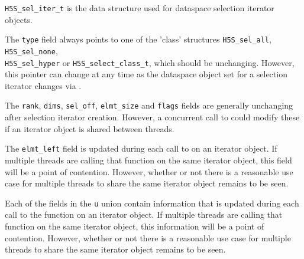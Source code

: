 \documentclass[../HDF5_RFC.tex]{subfiles}
\begin{document}
\texttt{H5S\_sel\_iter\_t} is the data structure used for dataspace selection iterator objects.

The \texttt{type} field always points to one of the 'class' structures \texttt{H5S\_sel\_all},
\texttt{H5S\_sel\_none}, \\
\texttt{H5S\_sel\_hyper} or \texttt{H5S\_select\_class\_t}, which should be unchanging. However,
this pointer can change at any time as the dataspace object set for a selection iterator changes
via .

The \texttt{rank}, \texttt{dims}, \texttt{sel\_off}, \texttt{elmt\_size} and \texttt{flags}
fields are generally unchanging after selection iterator creation. However, a concurrent call
to  could modify these if an iterator object is shared
between threads.

The \texttt{elmt\_left} field is updated during each call to 
on an iterator object. If multiple threads are calling that function on the same iterator object,
this field will be a point of contention. However, whether or not there is a reasonable use case
for multiple threads to share the same iterator object remains to be seen.

Each of the fields in the \texttt{u} union contain information that is updated during each call to
the function  on an iterator object. If multiple
threads are calling that function on the same iterator object, this information will be a point of
contention. However,  whether or not there is a reasonable use case for multiple threads to share
the same iterator object remains to be seen.
\end{document}
